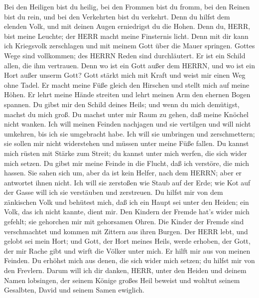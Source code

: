  Bei den Heiligen bist du heilig, bei den Frommen bist du
fromm,  bei den Reinen bist du rein, und bei den Verkehrten
bist du verkehrt.  Denn du hilfst dem elenden Volk, und mit
deinen Augen erniedrigst du die Hohen.  Denn du, HERR, bist
meine Leuchte; der HERR macht meine Finsternis licht.  Denn
mit dir kann ich Kriegsvolk zerschlagen und mit meinem Gott über die
Mauer springen.  Gottes Wege sind vollkommen; des HERRN
Reden sind durchläutert. Er ist ein Schild allen, die ihm vertrauen.
 Denn wo ist ein Gott außer dem HERRN, und wo ist ein Hort
außer unserm Gott?  Gott stärkt mich mit Kraft und weist
mir einen Weg ohne Tadel.  Er macht meine Füße gleich den
Hirschen und stellt mich auf meine Höhen.  Er lehrt meine
Hände streiten und lehrt meinen Arm den ehernen Bogen spannen.
 Du gibst mir den Schild deines Heils; und wenn du mich
demütigst, machst du mich groß.  Du machst unter mir Raum
zu gehen, daß meine Knöchel nicht wanken.  Ich will meinen
Feinden nachjagen und sie vertilgen und will nicht umkehren, bis ich sie
umgebracht habe.  Ich will sie umbringen und zerschmettern;
sie sollen mir nicht widerstehen und müssen unter meine Füße fallen.
 Du kannst mich rüsten mit Stärke zum Streit; du kannst
unter mich werfen, die sich wider mich setzen.  Du gibst
mir meine Feinde in die Flucht, daß ich verstöre, die mich hassen.
 Sie sahen sich um, aber da ist kein Helfer, nach dem
HERRN; aber er antwortet ihnen nicht.  Ich will sie
zerstoßen wie Staub auf der Erde; wie Kot auf der Gasse will ich sie
verstäuben und zerstreuen.  Du hilfst mir von dem
zänkischen Volk und behütest mich, daß ich ein Haupt sei unter den
Heiden; ein Volk, das ich nicht kannte, dient mir.  Den
Kindern der Fremde hat's wider mich gefehlt; sie gehorchen mir mit
gehorsamen Ohren.  Die Kinder der Fremde sind verschmachtet
und kommen mit Zittern aus ihren Burgen.  Der HERR lebt,
und gelobt sei mein Hort; und Gott, der Hort meines Heils, werde
erhoben,  der Gott, der mir Rache gibt und wirft die Völker
unter mich.  Er hilft mir aus von meinen Feinden. Du
erhöhst mich aus denen, die sich wider mich setzen; du hilfst mir von
den Frevlern.  Darum will ich dir danken, HERR, unter den
Heiden und deinem Namen lobsingen,  der seinem Könige
großes Heil beweist und wohltut seinem Gesalbten, David und seinem Samen
ewiglich.

